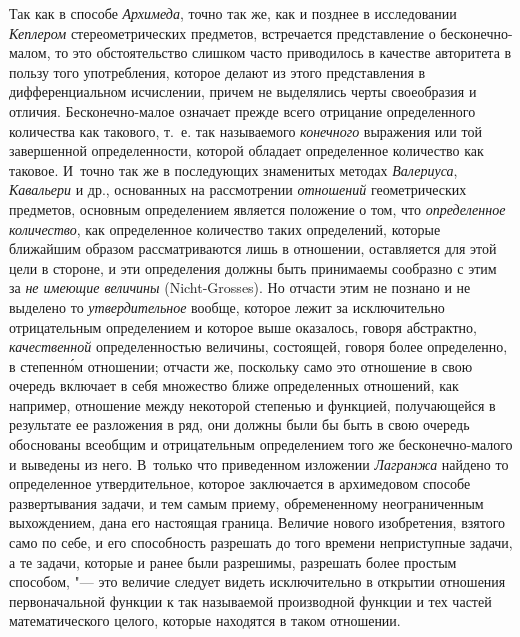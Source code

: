 Так как в способе {\em Архимеда}, точно так же, как и позднее в исследовании
{\em Кеплером} стереометрических предметов, встречается представление о
бесконечно-малом, то это обстоятельство слишком часто приводилось в качестве
авторитета в пользу того употребления, которое делают из этого представления в
дифференциальном исчислении, причем не выделялись черты своеобразия и отличия.
Бесконечно-малое означает прежде всего отрицание определенного количества как
такового, т.~е. так называемого {\em конечного} выражения или той завершенной
определенности, которой обладает определенное количество как таковое. И~точно
так же в последующих знаменитых методах {\em Валериуса}, {\em Кавальери} и др.,
основанных на рассмотрении {\em отношений} геометрических предметов, основным
определением является положение о том, что {\em определенное количество}, как
определенное количество таких определений, которые ближайшим образом
рассматриваются лишь в отношении, оставляется для этой цели в стороне, и эти
определения должны быть принимаемы сообразно с этим за {\em не имеющие
величины} (Nicht-Grosses). Но отчасти этим не познано и не выделено то
{\em утвердительное} вообще, которое лежит за исключительно отрицательным
определением и которое выше оказалось, говоря абстрактно, {\em качественной}
определенностью величины, состоящей, говоря более определенно, в степенн\'{о}м
отношении; отчасти же, поскольку само это отношение в свою очередь включает в
себя множество ближе определенных отношений, как например, отношение между
некоторой степенью и функцией, получающейся в результате ее разложения в ряд,
они должны были бы быть в свою очередь обоснованы всеобщим и отрицательным
определением того же бесконечно-малого и выведены из него. В~только что
приведенном изложении {\em Лагранжа} найдено то определенное утвердительное,
которое заключается в архимедовом способе развертывания задачи, и тем самым
приему, обремененному неограниченным выхождением, дана его настоящая граница.
Величие нового изобретения, взятого само по себе, и его способность разрешать
до того времени неприступные задачи, а те задачи, которые и ранее были
разрешимы, разрешать более простым способом, "--- это величие следует видеть
исключительно в открытии отношения первоначальной функции к так называемой
производной функции и тех частей математического целого, которые находятся в
таком отношении.

